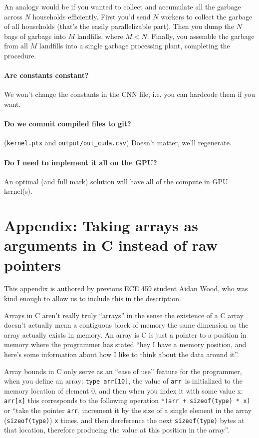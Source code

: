 An analogy would be if you wanted to collect and accumulate all the garbage across $N$ households efficiently. First you'd send $N$ workers to collect the garbage of all households (that's the easily parallelizable part). Then you dump the $N$ bags of garbage into $M$ landfills, where $M < N$. Finally, you assemble the garbage from all $M$ landfills into a single garbage processing plant, completing the procedure.

\paragraph{Are constants constant?} We won't change the constants in the CNN file, i.e. you can hardcode them if you want.

\paragraph{Do we commit compiled files to git?} (\verb+kernel.ptx+ and \verb+output/out_cuda.csv+) Doesn't matter, we'll regenerate.

\paragraph{Do I need to implement it all on the GPU?} An optimal (and full mark) solution will have all of the compute in GPU kernel(s).

\newpage
\section*{Appendix: Taking arrays as arguments in C instead of raw pointers}
This appendix is authored by previous ECE 459 student Aidan Wood, who was kind enough to allow us to include this in the description.

Arrays in C aren't really truly ``arrays'' in the sense the existence of a C array doesn't actually mean a contiguous block of memory the same dimension as the array actually exists in memory. An array is C is just a pointer to a position in memory where the programmer has stated ``hey I have a memory position, and here's some information about how I like to think about the data around it''. 

Array bounds in C only serve as an ``ease of use'' feature for the programmer, when you define an array: \texttt{type arr[10]}, the value of \texttt{arr }is initialized to the memory location of element 0, and then when you index it with some value x: \texttt{arr[x]} this corresponds to the following operation \texttt{*(arr + sizeof(type) * x)} or ``take the pointer \texttt{arr}, increment it by the size of a single element in the array (\texttt{sizeof(type)}) \texttt{x} times, and then dereference the next \texttt{sizeof(type)} bytes at that location, therefore producing the value at this position in the array''.

